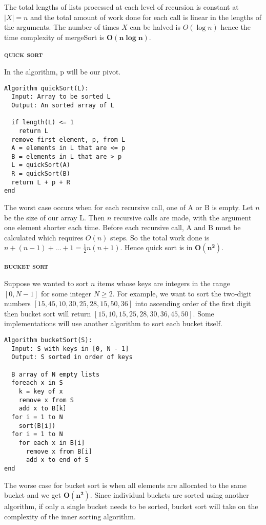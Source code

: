\documentclass[a4paper]{article}
\begin{document}
\begin{multicols}{2}
\begin{framed}
\noindent
The total lengths of lists processed at each level of recursion is constant at $\vert X \vert = n$ and the total amount of work done for each call is linear in the lengths of the arguments. The number of times $X$ can be halved is $O(\log n)$ hence the time complexity of mergeSort is $\bm{O(n \log n)}$.
\end{framed}

\begin{framed}
	\begin{center}
		\textbf{\textsc{quick sort}}
	\end{center}
\noindent
In the algorithm, p will be our pivot.
	\begin{lstlisting}
Algorithm quickSort(L):
  Input: Array to be sorted L
  Output: An sorted array of L
	
  if length(L) <= 1
    return L
  remove first element, p, from L
  A = elements in L that are <= p
  B = elements in L that are > p
  L = quickSort(A)
  R = quickSort(B)
  return L + p + R
end
\end{lstlisting}
	
\noindent
The worst case occurs when for each recursive call, one of A or B is empty.
Let $n$ be the size of our array L.
Then $n$ recursive calls are made, with the argument one element shorter each time.
Before each recursive call, A and B must be calculated which requires $O(n)$ steps.
So the total work done is $n+(n-1)+...+1=\frac{1}{2}n(n+1)$.
Hence quick sort is in $\bm{O(n^2)}$.

\end{framed}

\begin{framed}
	\begin{center}
		\textbf{\textsc{bucket sort}}
	\end{center}
\noindent
Suppose we wanted to sort $n$ items whose keys are integers in the range $[0, N - 1]$ for some integer $N \geq 2$. For example, we want to sort the two-digit numbers $[15, 45, 10, 30, 25, 28, 15, 50, 36]$ into ascending order of the first digit then bucket sort will return $[15, 10, 15, 25, 28, 30 , 36, 45, 50]$. Some implementations will use another algorithm to sort each bucket itself. 

\begin{lstlisting}
Algorithm bucketSort(S):
  Input: S with keys in [0, N - 1]
  Output: S sorted in order of keys

  B array of N empty lists
  foreach x in S
    k = key of x
    remove x from S
    add x to B[k]
  for i = 1 to N
    sort(B[i])
  for i = 1 to N
    for each x in B[i]
      remove x from B[i]
      add x to end of S
end
\end{lstlisting}
	
\noindent
The worse case for bucket sort is when all elements are allocated to the same bucket and we get $\bm{O(n^2)}$. Since individual buckets are sorted using another algorithm, if only a single bucket needs to be sorted, bucket sort will take on the complexity of the inner sorting algorithm.

\end{framed}

\end{multicols}
\end{document}
